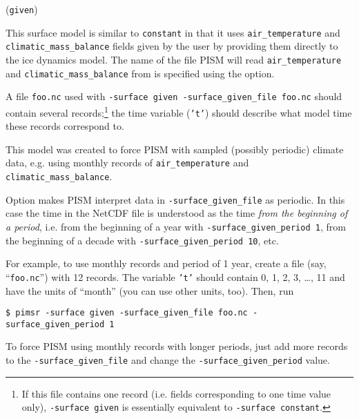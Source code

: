 \documentclass[titlepage,letterpaper,final]{scrartcl}
\begin{document}
(\texttt{given})

This surface model is similar to \texttt{constant} in that it uses \texttt{air_temperature} and \texttt{climatic_mass_balance} fields given by the user by providing them directly to the ice dynamics model. The name of the file PISM will read \texttt{air_temperature} and \texttt{climatic_mass_balance} from is specified using the  option.

A file \texttt{foo.nc} used with \texttt{-surface given -surface_given_file foo.nc} should contain several records;\footnote{If this file contains one record (i.e. fields corresponding to one time value only), \texttt{-surface given} is essentially equivalent to \texttt{-surface constant}.} the time variable (\texttt{'t'}) should describe what model time these records correspond to.

This model was created to force PISM with sampled (possibly periodic) climate data, e.g. using monthly records of \texttt{air_temperature} and \texttt{climatic_mass_balance}.

Option  makes PISM interpret data in \texttt{-surface_given_file} as periodic. In this case the time in the NetCDF file is understood as the time \emph{from the beginning of a period}, i.e. from the beginning of a year with \texttt{-surface_given_period 1}, from the beginning of a decade with \texttt{-surface_given_period 10}, etc.

For example, to use monthly records and period of 1 year, create a file (say, ``\texttt{foo.nc}'') with 12 records. The variable \texttt{'t'} should contain 0, 1, 2, 3, \dots, 11 and have the units of ``month'' (you can use other units, too). Then, run
\begin{verbatim}
$ pimsr -surface given -surface_given_file foo.nc -surface_given_period 1
\end{verbatim}%

To force PISM using monthly records with longer periods, just add more records to the \texttt{-surface_given_file}  and change the \texttt{-surface_given_period} value.
\end{document}
